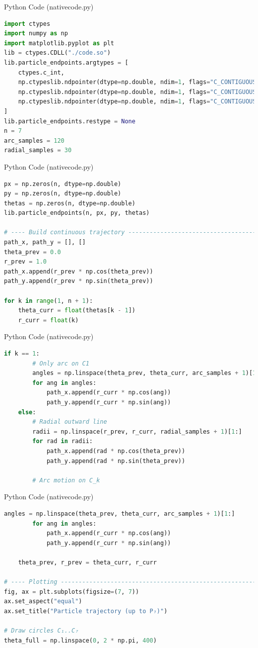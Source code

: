\documentclass{beamer}
\begin{document}
\begin{frame}[fragile]{Python Code (nativecode.py)}
\begin{lstlisting}[language=Python]
import ctypes
import numpy as np
import matplotlib.pyplot as plt
lib = ctypes.CDLL("./code.so")
lib.particle_endpoints.argtypes = [
    ctypes.c_int,
    np.ctypeslib.ndpointer(dtype=np.double, ndim=1, flags="C_CONTIGUOUS"),
    np.ctypeslib.ndpointer(dtype=np.double, ndim=1, flags="C_CONTIGUOUS"),
    np.ctypeslib.ndpointer(dtype=np.double, ndim=1, flags="C_CONTIGUOUS")
]
lib.particle_endpoints.restype = None
n = 7
arc_samples = 120
radial_samples = 30
\end{lstlisting}
\end{frame}
\begin{frame}[fragile]{Python Code (nativecode.py)}
\begin{lstlisting}[language=Python]
px = np.zeros(n, dtype=np.double)
py = np.zeros(n, dtype=np.double)
thetas = np.zeros(n, dtype=np.double)
lib.particle_endpoints(n, px, py, thetas)

# ---- Build continuous trajectory ----------------------------------------
path_x, path_y = [], []
theta_prev = 0.0
r_prev = 1.0
path_x.append(r_prev * np.cos(theta_prev))
path_y.append(r_prev * np.sin(theta_prev))

for k in range(1, n + 1):
    theta_curr = float(thetas[k - 1])
    r_curr = float(k)
\end{lstlisting}
\end{frame}
\begin{frame}[fragile]{Python Code (nativecode.py)}
\begin{lstlisting}[language=Python]
    if k == 1:
        # Only arc on C1
        angles = np.linspace(theta_prev, theta_curr, arc_samples + 1)[1:]
        for ang in angles:
            path_x.append(r_curr * np.cos(ang))
            path_y.append(r_curr * np.sin(ang))
    else:
        # Radial outward line
        radii = np.linspace(r_prev, r_curr, radial_samples + 1)[1:]
        for rad in radii:
            path_x.append(rad * np.cos(theta_prev))
            path_y.append(rad * np.sin(theta_prev))

        # Arc motion on C_k
\end{lstlisting}
\end{frame}
\begin{frame}[fragile]{Python Code (nativecode.py)}
\begin{lstlisting}[language=Python]
        angles = np.linspace(theta_prev, theta_curr, arc_samples + 1)[1:]
        for ang in angles:
            path_x.append(r_curr * np.cos(ang))
            path_y.append(r_curr * np.sin(ang))

    theta_prev, r_prev = theta_curr, r_curr

# ---- Plotting -----------------------------------------------------------
fig, ax = plt.subplots(figsize=(7, 7))
ax.set_aspect("equal")
ax.set_title("Particle trajectory (up to P₇)")

# Draw circles C₁..C₇
theta_full = np.linspace(0, 2 * np.pi, 400)
\end{lstlisting}
\end{frame}
\end{document}
